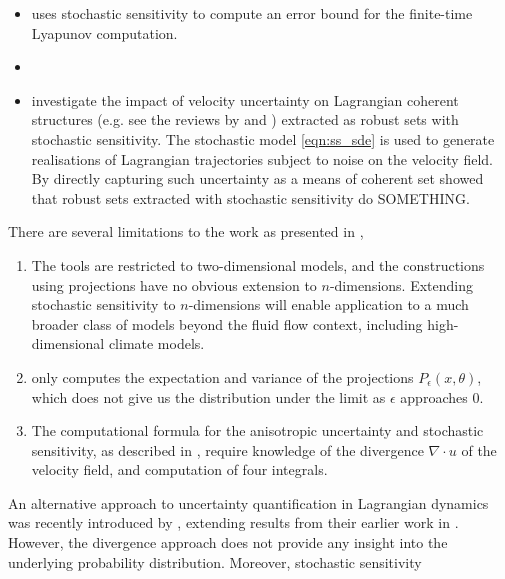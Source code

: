 \begin{itemize}
	\item \citet{Balasuriya_2020_UncertaintyFinitetimeLyapunov} uses stochastic sensitivity to compute an error bound for the finite-time Lyapunov computation.


	\item \citet{FangEtAl_2020_DisentanglingResolutionPrecision} 


	\item \citet{BadzaEtAl_2023_HowSensitiveAre} investigate the impact of velocity uncertainty on Lagrangian coherent structures (e.g. see the reviews by \citet{BalasuriyaEtAl_2018_GeneralizedLagrangianCoherent} and \citet{HadjighasemEtAl_2017_CriticalComparisonLagrangian}) extracted as robust sets with stochastic sensitivity.
		The stochastic model \eqref{eqn:ss_sde} is used to generate realisations of Lagrangian trajectories subject to noise on the velocity field. 
		By directly capturing such uncertainty as a means of coherent set \citet{BadzaEtAl_2023_HowSensitiveAre} showed that robust sets extracted with stochastic sensitivity do SOMETHING.

\end{itemize}
There are several limitations to the work as presented in \cite{Balasuriya_2020_StochasticSensitivityComputable},
\begin{enumerate}
	\item The tools are restricted to two-dimensional models, and the constructions using projections have no obvious extension to \(n\)-dimensions.
	      Extending stochastic sensitivity to \(n\)-dimensions will enable application to a much broader class of models beyond the fluid flow context, including high-dimensional climate models.

	\item \citet{Balasuriya_2020_StochasticSensitivityComputable} only computes the expectation and variance of the projections \(P_\epsilon(x,\theta)\), which does not give us the distribution under the limit as \(\epsilon\) approaches 0.

	\item The computational formula for the anisotropic uncertainty and stochastic sensitivity, as described in , require knowledge of the divergence \(\nabla\cdot u\) of the velocity field, and computation of four integrals.
\end{enumerate}

An alternative approach to uncertainty quantification in Lagrangian dynamics was recently introduced by \citet{BranickiUda_2023_PathBasedDivergenceRates}, extending results from their earlier work in \cite{BranickiUda_2021_LagrangianUncertaintyQuantification}. 
However, the divergence approach does not provide any insight into the underlying probability distribution.
Moreover, stochastic sensitivity 




